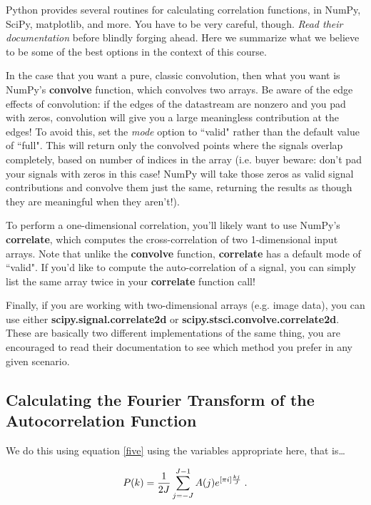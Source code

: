 \documentclass[11pt,preprint]{aastex}
\begin{document}
 Python provides several routines for calculating correlation
functions, in NumPy, SciPy, matplotlib, and more. You have to be very careful, 
though.  {\it Read their documentation} before blindly forging ahead. Here we 
summarize what we believe to be some of the best options in the context of this 
course.

In the case that you want a pure, classic convolution, then what you want is 
NumPy's {\bf convolve} function, which convolves two arrays. Be aware of the 
edge effects of convolution: if the edges of the datastream are nonzero and 
you pad with zeros,
convolution will give you a large meaningless contribution at the edges!
To avoid this, set the {\it mode} option to ``valid" rather than the default 
value of ``full". This will return only the convolved points where the signals 
overlap completely, based on number of indices in the array (i.e. buyer beware: 
don't pad your signals with zeros in this case! NumPy will take those zeros as 
valid signal contributions and convolve them just the same, returning the 
results as though they are meaningful when they aren't!).

To perform a one-dimensional correlation, you'll likely want to use NumPy's 
{\bf correlate}, which computes the cross-correlation of two 1-dimensional 
input arrays. Note that unlike the {\bf convolve} function, {\bf correlate} has 
a default mode of ``valid". If you'd like to compute the auto-correlation of a 
signal, you can simply list the same array twice in your {\bf correlate} 
function call!

Finally, if you are working with two-dimensional arrays (e.g. image data), you 
can use either {\bf scipy.signal.correlate2d} or {\bf 
scipy.stsci.convolve.correlate2d}. These are basically two different 
implementations of the same thing, you are encouraged to read their 
documentation to see which method you prefer in any given scenario.

\subsection{Calculating the Fourier Transform of the Autocorrelation
Function}

	We do this using equation \ref{five} using the variables
appropriate here, that is\dots

\begin{equation}
P(k) = {1 \over 2J} \sum_{j=-J}^{J-1} A(j) e^{[\pi i] {kj \over J}} \; .
\end{equation}
\end{document}
